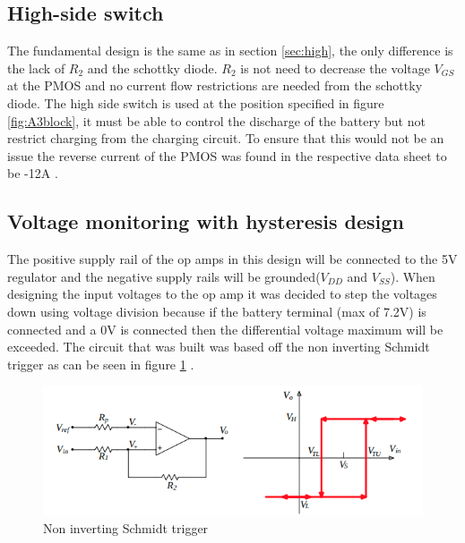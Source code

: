 \subsection{High-side switch}

The fundamental design is the same as in section \ref{sec:high}, the only difference is the lack of $R_2$ and the schottky diode. $R_2$ is not need to decrease the voltage $V_{GS}$ at the PMOS and no current flow restrictions are needed from the schottky diode. The high side switch is used at the position specified in figure \ref{fig:A3block}, it must be able to control the discharge of the battery but not restrict charging from the charging circuit. To ensure that this would not be an issue the reverse current of the PMOS was found in the respective data sheet to be -12A \cite{PMOS}.


\subsection{Voltage monitoring with hysteresis design}
 The positive supply rail of the op amps in this design will be connected to the 5V regulator and the negative supply rails will be grounded($V_{DD}$ and $V_{SS}$). When designing the input voltages to the op amp it was decided to step the voltages down using voltage division because if the battery terminal (max of 7.2V) is connected and a 0V is connected then the differential voltage maximum will be exceeded. The circuit that was built was based off the non inverting Schmidt trigger as can be seen in figure \ref{fig:schmidt2} \cite{Schmidt}.
 
 \begin{figure}[!htb]
 	\centering
 	\includegraphics[scale=0.5]{./Figures/schmidt}
 	\caption[Non inverting Schmidt trigger]{Non inverting Schmidt trigger\cite{Schmidt}}
 	\label{fig:schmidt2}
 \end{figure}

